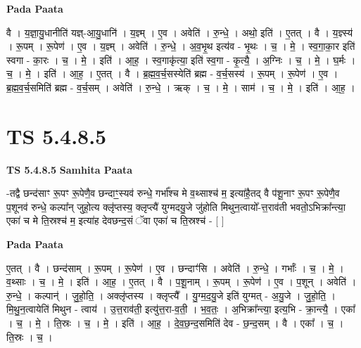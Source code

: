 \documentclass[17pt]{extarticle}
\begin{document}
\textbf{Pada Paata} \newline

वै । य॒ज्ञा॒यु॒धानीति॑ यज्ञ्-आ॒यु॒धानि॑ । य॒ज्ञ्म् । ए॒व । अवेति॑ । रु॒न्धे॒ । अथो॒ इति॑ । ए॒तत् । वै । य॒ज्ञ्स्य॑ । रू॒पम् । रू॒पेण॑ । ए॒व । य॒ज्ञ्म् । अवेति॑ । रु॒न्धे॒ । अ॒व॒भृ॒थ इत्य॑व - भृ॒थः । च॒ । मे॒ । स्व॒गा॒का॒र इति॑ स्वगा - का॒रः । च॒ । मे॒ । इति॑ । आ॒ह॒ । स्व॒गाकृ॑त्या॒ इति॑ स्व॒गा - कृ॒त्यै॒ । अ॒ग्निः । च॒ । मे॒ । घ॒र्मः । च॒ । मे॒ । इति॑ । आ॒ह॒ । ए॒तत् । वै । ब्र॒ह्म॒व॒र्च॒सस्येति॑ ब्रह्म - व॒र्च॒सस्य॑ । रू॒पम् । रू॒पेण॑ । ए॒व । ब्र॒ह्म॒व॒र्च॒समिति॑ ब्रह्म - व॒र्च॒सम् । अवेति॑ । रु॒न्धे॒ । ऋक् । च॒ । मे॒ । साम॑ । च॒ । मे॒ । इति॑ । आ॒ह॒ ।  \newline




\section*{ TS 5.4.8.5 }

\textbf{TS 5.4.8.5 } \newline
\textbf{Samhita Paata} \newline

-तद्वै छन्द॑साꣳ रू॒पꣳ रू॒पेणै॒व छन्दाꣳ॒॒स्यव॑ रुन्धे॒ गर्भा᳚श्च मे व॒थ्साश्च॑ म॒ इत्या॑है॒तद् वै प॑शू॒नाꣳ रू॒पꣳ रू॒पेणै॒व प॒शूनव॑ रुन्धे॒ कल्पा᳚न् जुहो॒त्य क्लृ॑प्तस्य॒ क्लृप्त्यै॑ युग्मदयु॒जे जु॑होति मिथुन॒त्वायो᳚-त्त॒राव॑ती भवतो॒ऽभिक्रा᳚न्त्या॒ एका॑ च मे ति॒स्रश्च॑ म॒ इत्या॑ह देवछन्द॒सं ॅवा एका॑ च ति॒स्रश्च॑ - [  ] \newline

\textbf{Pada Paata} \newline

ए॒तत् । वै । छन्द॑साम् । रू॒पम् । रू॒पेण॑ । ए॒व । छन्दाꣳ॑सि । अवेति॑ । रु॒न्धे॒ । गर्भाः᳚ । च॒ । मे॒ । व॒थ्साः । च॒ । मे॒ । इति॑ । आ॒ह॒ । ए॒तत् । वै । प॒शू॒नाम् । रू॒पम् । रू॒पेण॑ । ए॒व । प॒शून् । अवेति॑ । रु॒न्धे॒ । कल्पान्॑ । जु॒हो॒ति॒ । अक्लृ॑प्तस्य । क्लृप्त्यै᳚ । यु॒ग्म॒द॒यु॒जे इति॑ युग्मत् - अ॒यु॒जे । जु॒हो॒ति॒ । मि॒थु॒न॒त्वायेति॑ मिथुन - त्वाय॑ । उ॒त्त॒राव॑ती॒ इत्यु॑त्त॒रा-व॒ती॒ । भ॒व॒तः॒ । अ॒भिक्रा᳚न्त्या॒ इत्य॒भि - क्रा॒न्त्यै॒ । एका᳚ । च॒ । मे॒ । ति॒स्रः । च॒ । मे॒ । इति॑ । आ॒ह॒ । दे॒व॒छ॒न्द॒समिति॑ देव - छ॒न्द॒सम् । वै । एका᳚ । च॒ । ति॒स्रः । च॒ ।  \newline




\end{document}
